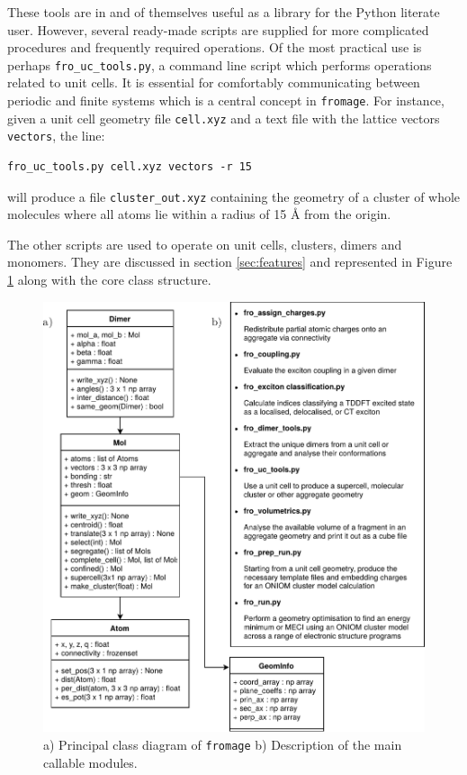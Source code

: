 These tools are in and of themselves useful as a library for the Python literate user. However, several ready-made scripts are supplied for more complicated procedures and frequently required operations. Of the most practical use is perhaps \texttt{fro\_uc\_tools.py}, a command line script which performs operations related to unit cells. It is essential for comfortably communicating between periodic and finite systems which is a central concept in \texttt{fromage}. For instance, given a unit cell geometry file \texttt{cell.xyz} and a text file with the lattice vectors \texttt{vectors}, the line:
\begin{verbatim}
fro_uc_tools.py cell.xyz vectors -r 15
\end{verbatim}
will produce a file \texttt{cluster\_out.xyz} containing the geometry of a cluster of whole molecules where all atoms lie within a radius of 15 \AA{} from the origin.

The other scripts are used to operate on unit cells, clusters, dimers and monomers. They are discussed in section \ref{sec:features} and represented in Figure \ref{fig:classes} along with the core class structure.

\begin{figure}[ht]
\centering
  \includegraphics[width=12cm]{Chapters/6Implementation/classes.pdf}
  \caption{a) Principal class diagram of \texttt{fromage} b) Description of the main callable modules.}
  \label{fig:classes}
\end{figure}

